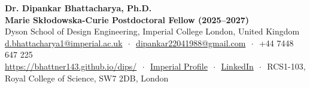 \documentclass[11pt,a4paper]{article}
\newcommand{\makerubric}[1]{}
\begin{document}
\begin{center}
  {\Huge\bfseries\sffamily\color{accent} Dr. Dipankar Bhattacharya, Ph.D.}\\[0.5em]
  {\large\bfseries Marie Sk\l{}odowska-Curie Postdoctoral Fellow (2025--2027)}\\
  Dyson School of Design Engineering, Imperial College London, United Kingdom\\[0.8em]
  \small
  \href{mailto:d.bhattacharya1@imperial.ac.uk}{d.bhattacharya1@imperial.ac.uk} $\,\cdot\,$ 
  \href{mailto:dipankar22041988@gmail.com}{dipankar22041988@gmail.com} $\,\cdot\,$ 
  +44 7448 647 225\\
  \href{https://bhattner143.github.io/dips/}{https://bhattner143.github.io/dips/} $\,\cdot\,$
  \href{https://profiles.imperial.ac.uk/d.bhattacharya1/about}{Imperial Profile} $\,\cdot\,$
  \href{https://www.linkedin.com/in/dipankar-bhattacharya-phd-imperial}{LinkedIn} $\,\cdot\,$ 
  RCS1-103, Royal College of Science, SW7 2DB, London
\end{center}

\vspace{0.5em}


\makerubric{education}
\makerubric{employment}


\makerubric{grants}
\makerubric{academic}
\makerubric{teaching}
\makerubric{skills}
\end{document}
